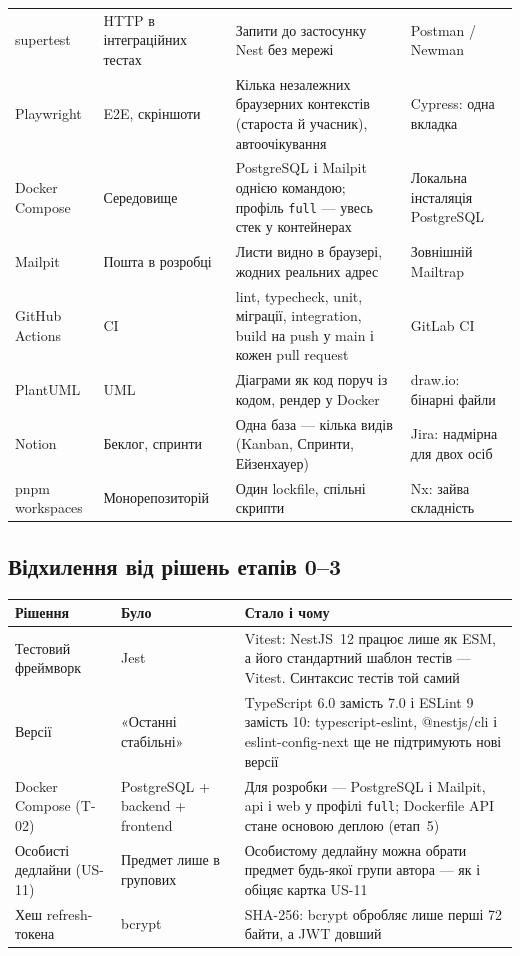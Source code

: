 \documentclass[12pt]{article}
\begin{document}
{\begin{longtable}{@{}L{2.9cm} L{3.1cm} L{5.7cm} L{3.6cm}@{}}
supertest & HTTP в інтеграційних тестах & Запити до застосунку Nest без мережі & Postman / Newman\\
Playwright & E2E, скріншоти & Кілька незалежних браузерних контекстів (староста й учасник), автоочікування & Cypress: одна вкладка\\
Docker Compose & Середовище & PostgreSQL і Mailpit однією командою; профіль \texttt{full} --- увесь стек у контейнерах & Локальна інсталяція PostgreSQL\\
Mailpit & Пошта в розробці & Листи видно в браузері, жодних реальних адрес & Зовнішній Mailtrap\\
GitHub Actions & CI & lint, typecheck, unit, міграції, integration, build на push у main і кожен pull request & GitLab CI\\
PlantUML & UML & Діаграми як код поруч із кодом, рендер у Docker & draw.io: бінарні файли\\
Notion & Беклог, спринти & Одна база --- кілька видів (Kanban, Спринти, Ейзенхауер) & Jira: надмірна для двох осіб\\
pnpm workspaces & Монорепозиторій & Один lockfile, спільні скрипти & Nx: зайва складність\\
\bottomrule
\end{longtable}}

\subsection{Відхилення від рішень етапів 0--3}
\begin{tabularx}{\textwidth}{L{3.3cm} L{3.4cm} Y}
\toprule
Рішення & Було & Стало і чому\\
\midrule
Тестовий фреймворк & Jest & Vitest: NestJS~12 працює лише як ESM, а його стандартний шаблон тестів --- Vitest. Синтаксис тестів той самий\\
Версії & «Останні стабільні» & TypeScript 6.0 замість 7.0 і ESLint 9 замість 10: typescript-eslint, @nestjs/cli і eslint-config-next ще не підтримують нові версії\\
Docker Compose (T-02) & PostgreSQL + backend + frontend & Для розробки --- PostgreSQL і Mailpit, api і web у профілі \texttt{full}; Dockerfile API стане основою деплою (етап~5)\\
Особисті дедлайни (US-11) & Предмет лише в групових & Особистому дедлайну можна обрати предмет будь-якої групи автора --- як і обіцяє картка US-11\\
Хеш refresh-токена & bcrypt & SHA-256: bcrypt обробляє лише перші 72 байти, а JWT довший\\
\bottomrule
\end{tabularx}
\end{document}
